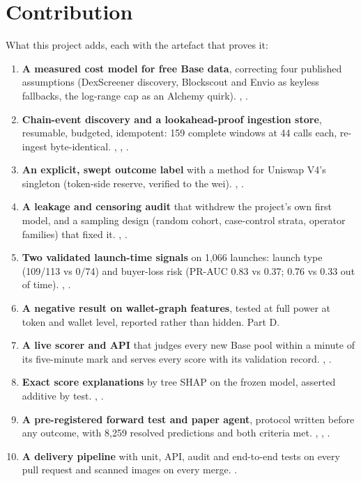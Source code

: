 \section{Contribution}
\label{sec:contribution}
What this project adds, each with the artefact that proves it:
\begin{enumerate}
  \item \textbf{A measured cost model for free Base data}, correcting four published assumptions (DexScreener discovery, Blockscout and Envio as keyless fallbacks, the log-range cap as an Alchemy quirk). , .
  \item \textbf{Chain-event discovery and a lookahead-proof ingestion store}, resumable, budgeted, idempotent: 159 complete windows at 44 calls each, re-ingest byte-identical. , , .
  \item \textbf{An explicit, swept outcome label} with a method for Uniswap V4's singleton (token-side reserve, verified to the wei). , .
  \item \textbf{A leakage and censoring audit} that withdrew the project's own first model, and a sampling design (random cohort, case-control strata, operator families) that fixed it. , .
  \item \textbf{Two validated launch-time signals} on 1,066 launches: launch type (109/113 vs 0/74) and buyer-loss risk (PR-AUC 0.83 vs 0.37; 0.76 vs 0.33 out of time). , .
  \item \textbf{A negative result on wallet-graph features}, tested at full power at token and wallet level, reported rather than hidden.  Part D.
  \item \textbf{A live scorer and API} that judges every new Base pool within a minute of its five-minute mark and serves every score with its validation record. , .
  \item \textbf{Exact score explanations} by tree SHAP on the frozen model, asserted additive by test. , .
  \item \textbf{A pre-registered forward test and paper agent}, protocol written before any outcome, with 8,259 resolved predictions and both criteria met. , , .
  \item \textbf{A delivery pipeline} with unit, API, audit and end-to-end tests on every pull request and scanned images on every merge. .
\end{enumerate}

